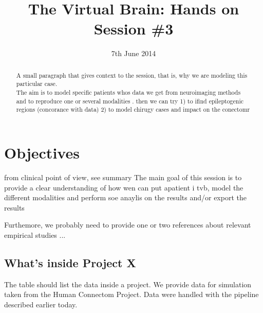 \documentclass{tufte-handout}
\title{The Virtual Brain: Hands on Session \#3}
\date{7th June 2014}
\begin{document}

\newpage
\ClearWallPaper


\begin{abstract}
\noindent A small paragraph that gives context to the session, that is, 
why we are modeling this particular case.\\
The aim is to model specific patients whos data we get from neuroimaging methods and to reproduce one or several modalities . then we can try 
1) to ifind epileptogenic regions (concorance with data) 
2) to model chirugy cases and impact on the conectomr
\end{abstract}


 

\section{Objectives}\label{sec:objectives}
from clinical point of view, see summary
The main goal of this session is to provide a clear understanding of how wen can put apatient i tvb, model the different modalities and perform soe anaylis on the results and/or export the results

Furthemore, we probably need to provide one or two references about relevant
empirical studies ...


\subsection{What's inside Project X }\label{sec:project_data}

The table should list the data inside a project. 
We provide data for simulation taken from the Human Connectom Project. Data were handled with the pipeline described earlier today.
\end{document}
